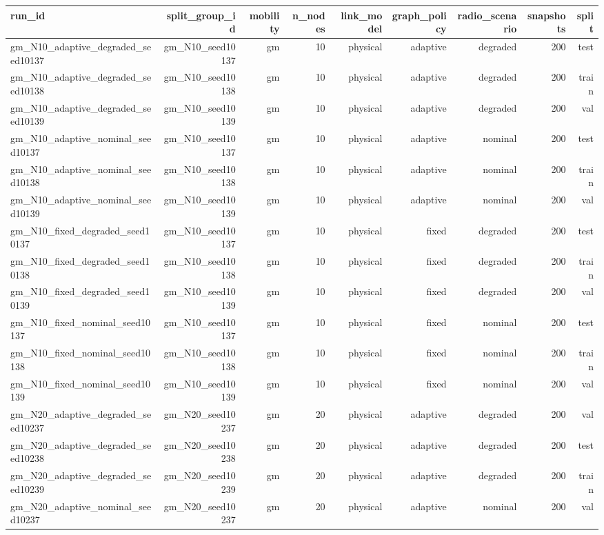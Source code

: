 \begin{tabular}{lrrrrrrrr}
\toprule
run\_id & split\_group\_id & mobility & n\_nodes & link\_model & graph\_policy & radio\_scenario & snapshots & split \\
\midrule
gm\_N10\_adaptive\_degraded\_seed10137 & gm\_N10\_seed10137 & gm & 10 & physical & adaptive & degraded & 200 & test \\
gm\_N10\_adaptive\_degraded\_seed10138 & gm\_N10\_seed10138 & gm & 10 & physical & adaptive & degraded & 200 & train \\
gm\_N10\_adaptive\_degraded\_seed10139 & gm\_N10\_seed10139 & gm & 10 & physical & adaptive & degraded & 200 & val \\
gm\_N10\_adaptive\_nominal\_seed10137 & gm\_N10\_seed10137 & gm & 10 & physical & adaptive & nominal & 200 & test \\
gm\_N10\_adaptive\_nominal\_seed10138 & gm\_N10\_seed10138 & gm & 10 & physical & adaptive & nominal & 200 & train \\
gm\_N10\_adaptive\_nominal\_seed10139 & gm\_N10\_seed10139 & gm & 10 & physical & adaptive & nominal & 200 & val \\
gm\_N10\_fixed\_degraded\_seed10137 & gm\_N10\_seed10137 & gm & 10 & physical & fixed & degraded & 200 & test \\
gm\_N10\_fixed\_degraded\_seed10138 & gm\_N10\_seed10138 & gm & 10 & physical & fixed & degraded & 200 & train \\
gm\_N10\_fixed\_degraded\_seed10139 & gm\_N10\_seed10139 & gm & 10 & physical & fixed & degraded & 200 & val \\
gm\_N10\_fixed\_nominal\_seed10137 & gm\_N10\_seed10137 & gm & 10 & physical & fixed & nominal & 200 & test \\
gm\_N10\_fixed\_nominal\_seed10138 & gm\_N10\_seed10138 & gm & 10 & physical & fixed & nominal & 200 & train \\
gm\_N10\_fixed\_nominal\_seed10139 & gm\_N10\_seed10139 & gm & 10 & physical & fixed & nominal & 200 & val \\
gm\_N20\_adaptive\_degraded\_seed10237 & gm\_N20\_seed10237 & gm & 20 & physical & adaptive & degraded & 200 & val \\
gm\_N20\_adaptive\_degraded\_seed10238 & gm\_N20\_seed10238 & gm & 20 & physical & adaptive & degraded & 200 & test \\
gm\_N20\_adaptive\_degraded\_seed10239 & gm\_N20\_seed10239 & gm & 20 & physical & adaptive & degraded & 200 & train \\
gm\_N20\_adaptive\_nominal\_seed10237 & gm\_N20\_seed10237 & gm & 20 & physical & adaptive & nominal & 200 & val \\

\end{tabular}
